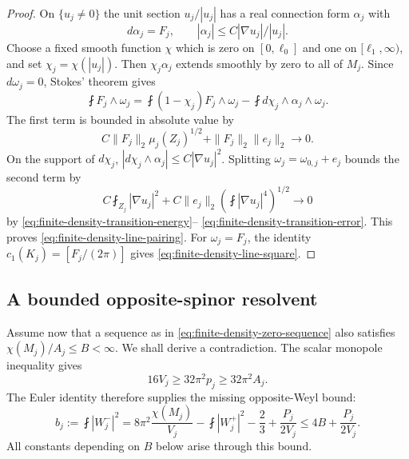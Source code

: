 \begin{proof}
On $\{u_j\ne0\}$ the unit section $u_j/|u_j|$ has a real connection
form $\alpha_j$ with
\[
 d\alpha_j=F_j,\qquad
 |\alpha_j|\le C|\nabla u_j|/|u_j|.
\]
Choose a fixed smooth function $\chi$ which is zero on
$[0,\ell_0]$ and one on $[\ell_1,\infty)$, and set
$\chi_j=\chi(|u_j|)$.  Then $\chi_j\alpha_j$ extends smoothly by
zero to all of $M_j$.  Since $d\omega_j=0$, Stokes' theorem gives
\begin{equation}
 \fint F_j\wedge\omega_j
 =\fint(1-\chi_j)F_j\wedge\omega_j
       -\fint d\chi_j\wedge\alpha_j\wedge\omega_j.
 \label{eq:finite-density-line-transgression}
\end{equation}
The first term is bounded in absolute value by
\[
 C\|F_j\|_2\mu_j(Z_j)^{1/2}
       +\|F_j\|_2\|e_j\|_2\longrightarrow0.
\]
On the support of $d\chi_j$,
$|d\chi_j\wedge\alpha_j|\le C|\nabla u_j|^2$.  Splitting
$\omega_j=\omega_{0,j}+e_j$ bounds the second term by
\[
 C\fint_{Z_j}|\nabla u_j|^2
 +C\|e_j\|_2\left(\fint|\nabla u_j|^4\right)^{1/2}
       \longrightarrow0
\]
by \eqref{eq:finite-density-transition-energy}--
\eqref{eq:finite-density-transition-error}.  This proves
\eqref{eq:finite-density-line-pairing}.  For $\omega_j=F_j$, the
identity $c_1(K_j)=[F_j/(2\pi)]$ gives
\eqref{eq:finite-density-line-square}.
\end{proof}

\subsection{A bounded opposite-spinor resolvent}

Assume now that a sequence as in
\eqref{eq:finite-density-zero-sequence} also satisfies
$\chi(M_j)/A_j\le B<\infty$.  We shall derive a contradiction.
The scalar monopole inequality gives
\[
 16V_j\ge32\pi^2p_j\ge32\pi^2A_j.
\]
The Euler identity therefore supplies the missing opposite-Weyl bound:
\begin{equation}
 b_j:=\fint|W_j^-|^2
 =8\pi^2\frac{\chi(M_j)}{V_j}
       -\fint|W_j^+|^2-\frac23+\frac{P_j}{2V_j}
 \le4B+\frac{P_j}{2V_j}.
 \label{eq:finite-density-opposite-weyl}
\end{equation}
All constants depending on $B$ below arise through this bound.

